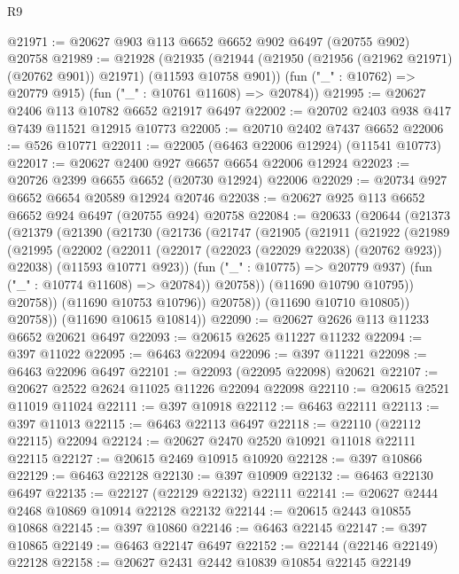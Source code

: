 \begin{lexlean}{R9}
\begin{coremodule}
{{{{{{{{{{{{{{{{{{{{{{{{{{{{{{{{{{{{{{{{{{{{{{{{{{{{{{{{{{{{{{{{{{{{{{{{{{{{{{{{{{{{@21971 := @20627 @903 @113 @6652 @6652 @902 @6497 (@20755 @902) @20758
@21989 := @21928
    (@21935
      (@21944 (@21950 (@21956 (@21962 @21971) (@20762 @901)) @21971) (@11593 @10758 @901))
      (fun ("_" : @10762) => @20779 @915)
      (fun ("_" : @10761 @11608) => @20784))
@21995 := @20627 @2406 @113 @10782 @6652 @21917 @6497
@22002 := @20702 @2403 @938 @417 @7439 @11521 @12915 @10773
@22005 := @20710 @2402 @7437 @6652
@22006 := @526 @10771
@22011 := @22005 (@6463 @22006 @12924) (@11541 @10773)
@22017 := @20627 @2400 @927 @6657 @6654 @22006 @12924
@22023 := @20726 @2399 @6655 @6652 (@20730 @12924) @22006
@22029 := @20734 @927 @6652 @6654 @20589 @12924 @20746
@22038 := @20627 @925 @113 @6652 @6652 @924 @6497 (@20755 @924) @20758
@22084 := @20633
    (@20644
      (@21373
        (@21379
          (@21390
            (@21730
              (@21736
                (@21747
                  (@21905
                    (@21911
                      (@21922
                        (@21989
                          (@21995
                            (@22002
                              (@22011
                                (@22017 (@22023 (@22029 @22038) (@20762 @923)) @22038)
                                (@11593 @10771 @923))
                              (fun ("_" : @10775) => @20779 @937)
                              (fun ("_" : @10774 @11608) => @20784))
                            @20758))
                        (@11690 @10790 @10795))
                      @20758))
                  (@11690 @10753 @10796))
                @20758))
            (@11690 @10710 @10805))
          @20758))
      (@11690 @10615 @10814))
@22090 := @20627 @2626 @113 @11233 @6652 @20621 @6497
@22093 := @20615 @2625 @11227 @11232
@22094 := @397 @11022
@22095 := @6463 @22094
@22096 := @397 @11221
@22098 := @6463 @22096 @6497
@22101 := @22093 (@22095 @22098) @20621
@22107 := @20627 @2522 @2624 @11025 @11226 @22094 @22098
@22110 := @20615 @2521 @11019 @11024
@22111 := @397 @10918
@22112 := @6463 @22111
@22113 := @397 @11013
@22115 := @6463 @22113 @6497
@22118 := @22110 (@22112 @22115) @22094
@22124 := @20627 @2470 @2520 @10921 @11018 @22111 @22115
@22127 := @20615 @2469 @10915 @10920
@22128 := @397 @10866
@22129 := @6463 @22128
@22130 := @397 @10909
@22132 := @6463 @22130 @6497
@22135 := @22127 (@22129 @22132) @22111
@22141 := @20627 @2444 @2468 @10869 @10914 @22128 @22132
@22144 := @20615 @2443 @10855 @10868
@22145 := @397 @10860
@22146 := @6463 @22145
@22147 := @397 @10865
@22149 := @6463 @22147 @6497
@22152 := @22144 (@22146 @22149) @22128
@22158 := @20627 @2431 @2442 @10839 @10854 @22145 @22149
}}}}}}}}}}}}}}}}}}}}}}}}}}}}}}}}}}}}}}}}}}}}}}}}}}}}}}}}}}}}}}}}}}}}}}}}}}}}}}}}}}}}
\end{coremodule}
\end{lexlean}
